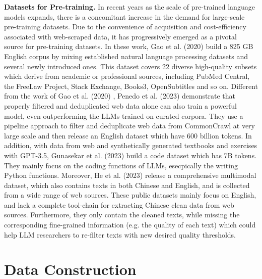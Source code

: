 \documentclass{article}
\begin{document}
\textbf{Datasets for Pre-training.} In recent years as the scale of pre-trained language models expands, there is a concomitant increase in the demand for large-scale pre-training datasets. Due to the convenience of acquisition and cost-efficiency associated with web-scraped data, it has progressively emerged as a pivotal source for pre-training datasets\cite{raffel2020exploring}. In these work, Gao et al. (2020) \cite{gao2020pile} build a 825 GB English corpus by mixing established natural language processing datasets and several newly introduced ones. This dataset covers 22 diverse high-quality subsets which derive from academic or professional sources, including PubMed Central, the FreeLaw Project, Stack Exchange, Books3\cite{presser2020books3}, OpenSubtitles\cite{tiedemann2016finding} and so on. Different from the work of Gao et al. (2020) \cite{gao2020pile}, Penedo et al. (2023)\cite{penedo2023refinedweb} demonstrate that properly filtered and deduplicated web data alone can also train a powerful model, even outperforming the LLMs trained on curated corpora. They use a pipeline approach to filter and deduplicate web data from CommonCrawl at very large scale and then release an English dataset which have 600 billion tokens. In addition, with data from web and synthetically generated textbooks and exercises with GPT-3.5, Gunasekar et al. (2023)\cite{gunasekar2023textbooks} build a code dataset which has 7B tokens. They mainly focus on the coding functions of LLMs, esecpically the writing Python functions. Moreover, He et al. (2023) \cite{he2023wanjuan} release a comprehensive multimodal dataset, which also contains texts in both Chinese and English, and is collected from a wide range of web sources. These public datasets mainly focus on English, and lack a complete tool-chain for extracting Chinese clean data from web sources. Furthermore, they only contain the cleaned texts, while missing the corresponding fine-grained information (e.g. the quality of each text) which could help LLM researchers to re-filter texts with new desired quality thresholds.


\section{Data Construction}
\end{document}
